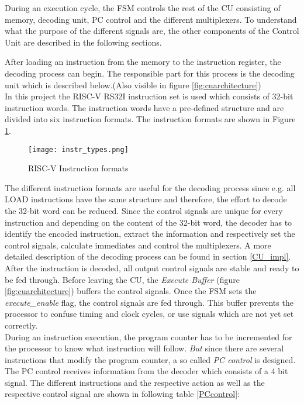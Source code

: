 During an execution cycle, the FSM controls the rest of the CU consisting of memory, decoding unit, PC control and the different multiplexers. To understand what the purpose of the different signals are, the other components of the Control Unit are described in the following sections.

After loading an instruction from the memory to the instruction register, the decoding process can begin. The responsible part for this process is the decoding unit which is described below.(Also visible in figure \ref{fig:cuarchitecture})\\
In this project the RISC-V RS32I instruction set is used which consists of 32-bit instruction words. The instruction words have a pre-defined structure and are divided into six instruction formats.
The instruction formats are shown in Figure \ref{fig:instrtypes}.

\begin{figure}[h]
	\centering
	\texttt{[image: instr\_types.png]}
	\caption{RISC-V Instruction formats \cite{riscv}}
	\label{fig:instrtypes}
\end{figure}
The different instruction formats are useful for the decoding process since e.g. all LOAD instructions have the same structure and therefore, the effort to decode the 32-bit word can be reduced. Since the control signals are unique for every instruction and depending on the content of the 32-bit word, the decoder has to identify the encoded instruction, extract the information and respectively set the control signals, calculate immediates and control the multiplexers. A more detailed description of the decoding process can be found in section \ref{CU_impl}.\\
After the instruction is decoded, all output control signals are stable and ready to be fed through. Before leaving the CU, the \textit{Execute Buffer} (figure \ref{fig:cuarchitecture}) buffers the control signals. Once the FSM sets the \textit{execute\_enable} flag, the control signals are fed through. This buffer prevents the processor to confuse timing and clock cycles, or use signals which are not yet set correctly.\\
During an instruction execution, the program counter has to be incremented for the processor to know what instruction will follow. \textit{But} since there are several instructions that modify the program counter, a so called \textit{PC control} is designed. The PC control receives information from the decoder which consists of a 4 bit signal. The different instructions and the respective action as well as the respective control signal are shown in following table \ref{PCcontrol}:\clearpage

